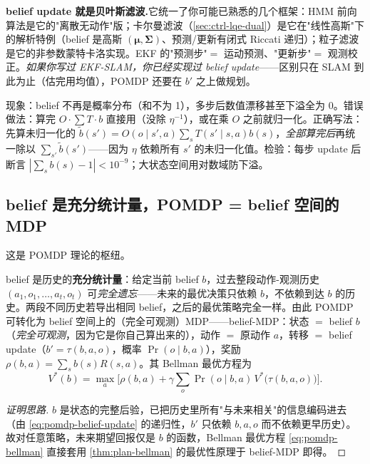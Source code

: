 \begin{note}
\textbf{belief update 就是贝叶斯滤波.}\;它统一了你可能已熟悉的几个框架：HMM 前向算法是它的"离散无动作"版；卡尔曼滤波（\cref{sec:ctrl-lqe-dual}）是它在"线性高斯"下的解析特例（belief 是高斯 $(\boldsymbol{\mu},\boldsymbol{\Sigma})$、预测/更新有闭式 Riccati 递归）；粒子滤波是它的非参数蒙特卡洛实现。EKF 的"预测步"$=$ 运动预测、"更新步"$=$ 观测校正。\emph{如果你写过 EKF-SLAM，你已经实现过 belief update}——区别只在 SLAM 到此为止（估完用均值），POMDP 还要在 $b'$ 之上做规划。
\end{note}

\begin{pitfall}
现象：belief 不再是概率分布（和不为 1），多步后数值漂移甚至下溢全为 0。错误做法：算完 $O\cdot\sum T\cdot b$ 直接用（没除 $\eta^{-1}$），或在乘 $O$ 之前就归一化。正确写法：先算未归一化的 $\tilde b(s')=O(o\mid s',a)\sum_s T(s'\mid s,a)b(s)$，\emph{全部算完后}再统一除以 $\sum_{s'}\tilde b(s')$——因为 $\eta$ 依赖所有 $s'$ 的未归一化值。检验：每步 update 后断言 $|\sum_s b(s)-1|<10^{-9}$；大状态空间用对数域防下溢。
\end{pitfall}

\subsection{belief 是充分统计量，POMDP = belief 空间的 MDP}
\label{sec:pomdp-suff}

这是 POMDP 理论的枢纽。

\begin{theorem}\label{thm:pomdp-suff}
belief 是历史的\textbf{充分统计量}：给定当前 belief $b$，过去整段动作-观测历史 $(a_1,o_1,\dots,a_t,o_t)$ 可\emph{完全遗忘}——未来的最优决策只依赖 $b$，不依赖到达 $b$ 的历史。两段不同历史若导出相同 belief，之后的最优策略完全一样。由此 POMDP 可转化为 belief 空间上的（完全可观测）MDP——belief-MDP：状态 $=$ belief $b$（\emph{完全可观测}，因为它是你自己算出来的），动作 $=$ 原动作 $a$，转移 $=$ belief update（$b'=\tau(b,a,o)$，概率 $\Pr(o\mid b,a)$），奖励 $\rho(b,a)=\sum_s b(s)R(s,a)$。其 Bellman 最优方程为
\begin{equation}
  V^*(b)=\max_{a}\Big[\rho(b,a)+\gamma\sum_{o}\Pr(o\mid b,a)\,V^*\big(\tau(b,a,o)\big)\Big].
  \label{eq:pomdp-bellman}
\end{equation}
\end{theorem}
\begin{proof}[证明思路]
$b$ 是状态的完整后验，已把历史里所有"与未来相关"的信息编码进去（由 \cref{eq:pomdp-belief-update} 的递归性，$b'$ 只依赖 $b,a,o$ 而不依赖更早历史）。故对任意策略，未来期望回报仅是 $b$ 的函数，Bellman 最优方程 \cref{eq:pomdp-bellman} 直接套用 \cref{thm:plan-bellman} 的最优性原理于 belief-MDP 即得。
\end{proof}

